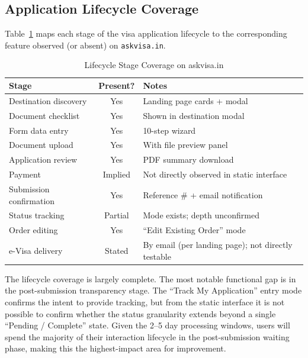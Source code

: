 \documentclass[journal, 10pt, twoside]{IEEEtran}
\begin{document}
\subsection{Application Lifecycle Coverage}
Table~\ref{tab:lifecycle} maps each stage of the visa application
lifecycle to the corresponding feature observed (or absent) on
\texttt{askvisa.in}.

\begin{table}[ht]
  \centering
  \caption{Lifecycle Stage Coverage on askvisa.in}
  \label{tab:lifecycle}
  \begin{tabular}{@{}p{2.4cm} c p{3.2cm}@{}}
    \toprule
    \textbf{Stage} & \textbf{Present?} & \textbf{Notes} \\
    \midrule
    Destination discovery     & Yes & Landing page cards + modal \\
    Document checklist        & Yes & Shown in destination modal \\
    Form data entry           & Yes & 10-step wizard \\
    Document upload           & Yes & With file preview panel \\
    Application review        & Yes & PDF summary download \\
    Payment                   & Implied & Not directly observed in
                                          static interface \\
    Submission confirmation   & Yes & Reference \# + email
                                       notification \\
    Status tracking           & Partial & Mode exists; depth
                                          unconfirmed \\
    Order editing             & Yes & ``Edit Existing Order'' mode \\
    e-Visa delivery           & Stated & By email (per landing page);
                                          not directly testable \\
    \bottomrule
  \end{tabular}
\end{table}

The lifecycle coverage is largely complete. The most notable functional
gap is in the post-submission transparency stage. The ``Track My
Application'' entry mode confirms the intent to provide tracking, but
from the static interface it is not possible to confirm whether the
status granularity extends beyond a single ``Pending / Complete''
state. Given the 2--5 day processing windows, users will spend the
majority of their interaction lifecycle in the post-submission waiting
phase, making this the highest-impact area for improvement.
\end{document}
